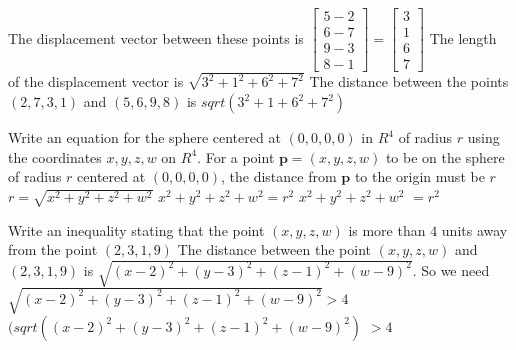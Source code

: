 \documentclass{article}
\newcommand{\R}{R}
\newcommand{\verticalvector}[1]{\begin{bmatrix}#1\end{bmatrix}}
\newcommand{\answer}[1]{#1}
\newenvironment{question}{}{}
\newenvironment{hint}{}{}
\newenvironment{solution}{}{}
\begin{document}
\begin{question}
  \begin{solution}
    \begin{hint}
      The displacement vector between these points is $\verticalvector{5-2\\6-7\\9-3\\8-1} = \verticalvector{3\\1\\6\\7}$
    \end{hint}
    \begin{hint}
      The length of the displacement vector is $\sqrt{3^2+1^2+6^2+7^2}$
    \end{hint}
    The distance between the points $(2,7,3,1)$ and $(5,6,9,8)$ is \answer{$sqrt(3^2+1+6^2+7^2)$}
  \end{solution}
\end{question}

\begin{question}
  Write an equation for the sphere centered at $(0,0,0,0)$ in $\R^4$ of radius $r$ using the coordinates $x,y,z,w$ on $\R^4$.
  \begin{solution}
    \begin{hint}
      For a point $\mathbf{p}=(x,y,z,w)$ to be on the sphere of radius $r$ centered at $(0,0,0,0)$, the distance from $\mathbf{p}$
      to the origin must be $r$
    \end{hint}
    \begin{hint}
      $r = \sqrt{x^2+y^2+z^2+w^2}$
    \end{hint}
    \begin{hint}
      $x^2+y^2+z^2+w^2=r^2$
    \end{hint}
    \answer{$x^2+y^2+z^2+w^2$} $= r^2$
  \end{solution}
\end{question}

\begin{question}
  Write an inequality stating that the point $(x,y,z,w)$ is more than $4$ units away from the point $(2,3,1,9)$
  \begin{solution}
    \begin{hint}
      The distance between the point $(x,y,z,w)$ and $(2,3,1,9)$ is $\sqrt{(x-2)^2+(y-3)^2+(z-1)^2+(w-9)^2}$.
    \end{hint}
    \begin{hint}
      So we need $\sqrt{(x-2)^2+(y-3)^2+(z-1)^2+(w-9)^2} > 4$
    \end{hint}
    \answer{$(sqrt((x-2)^2+(y-3)^2+(z-1)^2+(w-9)^2)$} $>4$ 
  \end{solution}
\end{question}
\end{document}

